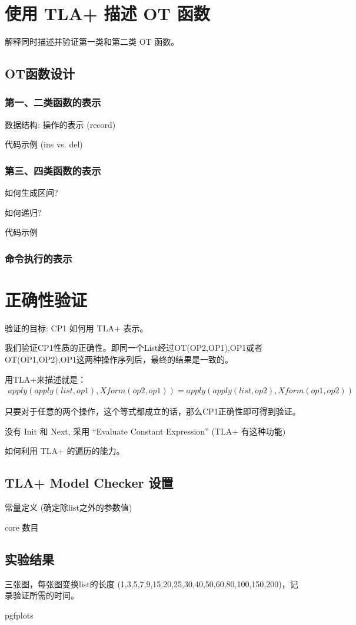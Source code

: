 \section{使用 TLA+ 描述 OT 函数}

解释同时描述并验证第一类和第二类 OT 函数。
 	 	
\subsection{OT函数设计}
\subsubsection{第一、二类函数的表示}
数据结构: 操作的表示 (record)

代码示例 (ins vs. del)

\subsubsection{第三、四类函数的表示}
如何生成区间?

如何递归?

代码示例

\subsubsection{命令执行的表示}

\section{正确性验证}

验证的目标: CP1 如何用 TLA+ 表示。

\par 我们验证CP1性质的正确性。即同一个List经过OT(OP2,OP1),OP1或者OT(OP1,OP2),OP1这两种操作序列后，最终的结果是一致的。
\par 用TLA+来描述就是：
\begin{align*}
  apply(apply(list,op1),Xform(op2, op1)) = apply(apply(list,op2),Xform(op1, op2))
\end{align*}
\par 只要对于任意的两个操作，这个等式都成立的话，那么CP1正确性即可得到验证。

没有 Init 和 Next, 采用 ``Evaluate Constant Expression'' (TLA+ 有这种功能)


如何利用 TLA+ 的遍历的能力。

\subsection{TLA+ Model Checker 设置}


常量定义 (确定除list之外的参数值)

core 数目

\subsection{实验结果}

三张图，每张图变换list的长度 (1,3,5,7,9,15,20,25,30,40,50,60,80,100,150,200)，记录验证所需的时间。

pgfplots